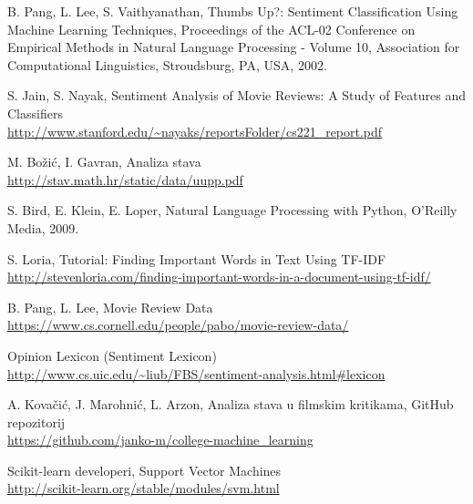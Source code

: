 \documentclass[conference]{IEEEtran}
\begin{document}
\begin{thebibliography}{1}

	B. Pang, L. Lee, S. Vaithyanathan,
 	Thumbs Up?: Sentiment Classification Using Machine Learning Techniques,
 	Proceedings of the ACL-02 Conference on Empirical Methods in Natural Language Processing - Volume 10,
 	Association for Computational Linguistics,
	Stroudsburg, PA, USA,
	2002.
	
	S. Jain, S. Nayak,
	Sentiment Analysis of Movie Reviews: A Study of Features and Classifiers\\
	\url{http://www.stanford.edu/~nayaks/reportsFolder/cs221_report.pdf}
	
	M. Božić, I. Gavran,
	Analiza stava\\
	\url{http://stav.math.hr/static/data/uupp.pdf}
	
	S. Bird, E. Klein, E. Loper,
	Natural Language Processing with Python,
	O'Reilly Media,
	2009.
	
	S. Loria,
	Tutorial: Finding Important Words in Text Using TF-IDF\\
	\url{http://stevenloria.com/finding-important-words-in-a-document-using-tf-idf/}

	B. Pang, L. Lee,
	Movie Review Data\\
	\url{https://www.cs.cornell.edu/people/pabo/movie-review-data/}
	
	Opinion Lexicon (Sentiment Lexicon)\\
	\url{http://www.cs.uic.edu/~liub/FBS/sentiment-analysis.html#lexicon}
	
	A. Kovačić, J. Marohnić, L. Arzon,
	Analiza stava u filmskim kritikama,
	GitHub repozitorij\\
	\url{https://github.com/janko-m/college-machine_learning}

    Scikit-learn developeri,
    Support Vector Machines\\
    \url{http://scikit-learn.org/stable/modules/svm.html}

\end{thebibliography}
\end{document}
